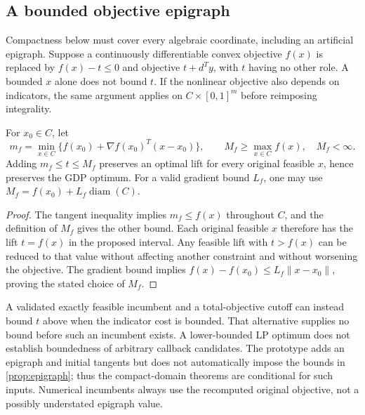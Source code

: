 \subsection{A bounded objective epigraph}\label{sec:epigraph}
Compactness below must cover every algebraic coordinate, including an artificial epigraph. Suppose a continuously differentiable convex objective $f(x)$ is replaced by $f(x)-t\le0$ and objective $t+d^Ty$, with $t$ having no other role. A bounded $x$ alone does not bound $t$. If the nonlinear objective also depends on indicators, the same argument applies on $C\times[0,1]^m$ before reimposing integrality.
\begin{proposition}\label{prop:epigraph}
For $x_0\in C$, let
\[
 m_f=\min_{x\in C}\{f(x_0)+\nabla f(x_0)^T(x-x_0)\},\qquad
 M_f\ge\max_{x\in C}f(x),\quad M_f<\infty.
\]
Adding $m_f\le t\le M_f$ preserves an optimal lift for every original feasible $x$, hence preserves the GDP optimum. For a valid gradient bound $L_f$, one may use $M_f=f(x_0)+L_f\operatorname{diam}(C)$.
\end{proposition}
\begin{proof}
The tangent inequality implies $m_f\le f(x)$ throughout $C$, and the definition of $M_f$ gives the other bound. Each original feasible $x$ therefore has the lift $t=f(x)$ in the proposed interval. Any feasible lift with $t>f(x)$ can be reduced to that value without affecting another constraint and without worsening the objective. The gradient bound implies $f(x)-f(x_0)\le L_f\|x-x_0\|$, proving the stated choice of $M_f$.
\end{proof}
A validated exactly feasible incumbent and a total-objective cutoff can instead bound $t$ above when the indicator cost is bounded. That alternative supplies no bound before such an incumbent exists. A lower-bounded LP optimum does not establish boundedness of arbitrary callback candidates. The prototype adds an epigraph and initial tangents but does not automatically impose the bounds in \cref{prop:epigraph}; thus the compact-domain theorems are conditional for such inputs. Numerical incumbents always use the recomputed original objective, not a possibly understated epigraph value.
